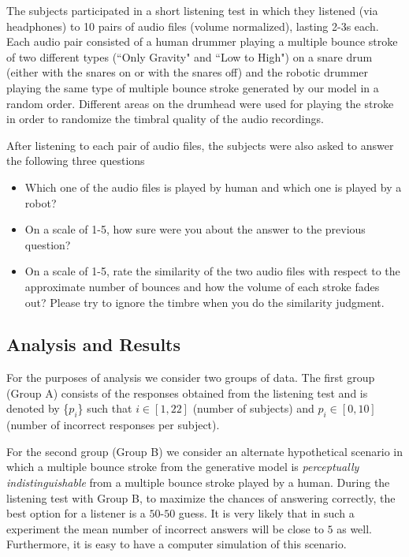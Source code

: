 \documentclass[final,1p,times]{elsarticle}
\begin{document}
The subjects participated in a short listening test in which they listened
(via headphones) to 10 pairs of audio files (volume normalized), lasting 2-3s each. Each audio pair consisted of a human drummer playing a multiple
bounce stroke of two different types (``Only Gravity" and ``Low to High") on a snare drum (either with the snares on or with the snares off) and the robotic drummer playing the same type of multiple bounce stroke generated by our model in a random order. Different areas on the drumhead were used for playing the stroke in order to randomize the timbral quality of the audio recordings.

After listening to each pair of audio files, the subjects were also asked to answer the following three questions
\begin{itemize}
	\item Which one of the audio files is played by human and which one is played by a robot?
	\item On a scale of 1-5, how sure were you about the answer to the previous question?
	\item On a scale of 1-5, rate the similarity of the two audio files with respect to the approximate number of bounces and how the volume of each stroke fades out? Please try to ignore the timbre when you do the similarity judgment.
\end{itemize}

\subsection{Analysis and Results}
For the purposes of analysis we consider two groups of data. The first group (Group A) consists of the responses obtained from the listening test and is denoted by \{$p_i$\} such that $i \in [1,22]$  (number of subjects) and $p_i \in [0,10]$ (number of incorrect responses per subject).

For the second group (Group B) we consider an alternate hypothetical scenario in which a multiple bounce stroke from the generative model is \textit{perceptually indistinguishable} from a multiple bounce stroke played by a human. During the listening test with Group B, to maximize the chances of answering correctly, the best option for a listener is a $50$-$50$ guess. It is very likely that in such a experiment the mean number of incorrect answers will be close to $5$ as well. Furthermore, it is easy to have a computer simulation of this scenario. 
\end{document}
